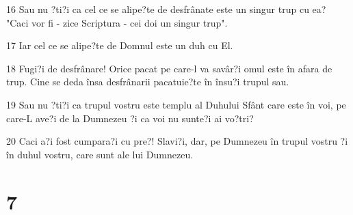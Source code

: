 \par 16 Sau nu ?ti?i ca cel ce se alipe?te de desfrânate este un singur trup cu ea? "Caci vor fi - zice Scriptura - cei doi un singur trup".
\par 17 Iar cel ce se alipe?te de Domnul este un duh cu El.
\par 18 Fugi?i de desfrânare! Orice pacat pe care-l va savâr?i omul este în afara de trup. Cine se deda însa desfrânarii pacatuie?te în însu?i trupul sau.
\par 19 Sau nu ?ti?i ca trupul vostru este templu al Duhului Sfânt care este în voi, pe care-L ave?i de la Dumnezeu ?i ca voi nu sunte?i ai vo?tri?
\par 20 Caci a?i fost cumpara?i cu pre?! Slavi?i, dar, pe Dumnezeu în trupul vostru ?i în duhul vostru, care sunt ale lui Dumnezeu.

\chapter{7}


